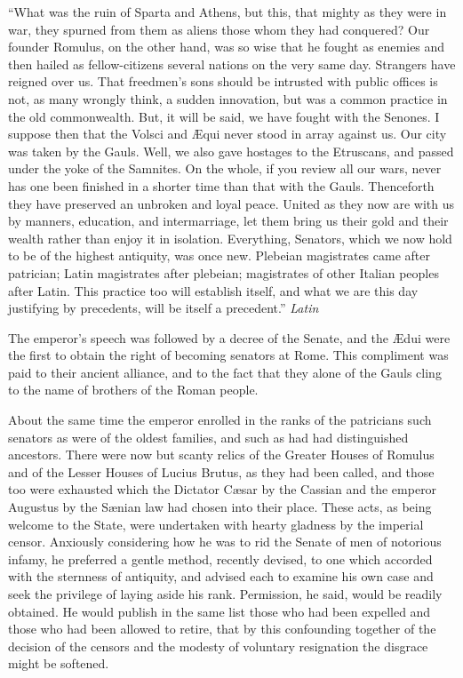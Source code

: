 ``What was the ruin of Sparta and Athens, but this, that mighty as they were in war, they spurned from them as aliens those whom they had conquered? Our founder Romulus, on the other hand, was so wise that he fought as enemies and then hailed as fellow-citizens several nations on the very same day. Strangers have reigned over us. That freedmen's sons should be intrusted with public offices is not, as many wrongly think, a sudden innovation, but was a common practice in the old commonwealth. But, it will be said, we have fought with the Senones. I suppose then that the Volsci and Æqui never stood in array against us. Our city was taken by the Gauls. Well, we also gave hostages to the Etruscans, and passed under the yoke of the Samnites. On the whole, if you review all our wars, never has one been finished in a shorter time than that with the Gauls. Thenceforth they have preserved an unbroken and loyal peace. United as they now are with us by manners, education, and intermarriage, let them bring us their gold and their wealth rather than enjoy it in isolation. Everything, Senators, which we now hold to be of the highest antiquity, was once new. Plebeian magistrates came after patrician; Latin magistrates after plebeian; magistrates of other Italian peoples after Latin. This practice too will establish itself, and what we are this day justifying by precedents, will be itself a precedent.'' \emph{Latin}


The emperor's speech was followed by a decree of the Senate, and the Ædui were the first to obtain the right of becoming senators at Rome. This compliment was paid to their ancient alliance, and to the fact that they alone of the Gauls cling to the name of brothers of the Roman people.

About the same time the emperor enrolled in the ranks of the patricians such senators as were of the oldest families, and such as had had distinguished ancestors. There were now but scanty relics of the Greater Houses of Romulus and of the Lesser Houses of Lucius Brutus, as they had been called, and those too were exhausted which the Dictator Cæsar by the Cassian and the emperor Augustus by the Sænian law had chosen into their place. These acts, as being welcome to the State, were undertaken with hearty gladness by the imperial censor. Anxiously considering how he was to rid the Senate of men of notorious infamy, he preferred a gentle method, recently devised, to one which accorded with the sternness of antiquity, and advised each to examine his own case and seek the privilege of laying aside his rank. Permission, he said, would be readily obtained. He would publish in the same list those who had been expelled and those who had been allowed to retire, that by this confounding together of the decision of the censors and the modesty of voluntary resignation the disgrace might be softened.

